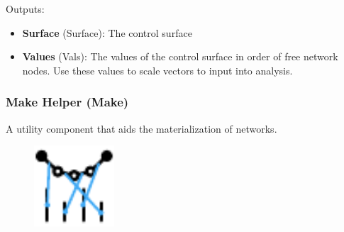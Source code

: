Outputs:
\begin{itemize}
    \setlength\itemsep{0.05em}
    \item \textbf{Surface} (Surface): The control surface
    \item \textbf{Values} (Vals): The values of the control surface in order of free network nodes. Use these values to scale vectors to input into analysis.
\end{itemize}

\subsubsection{Make Helper (Make)} \label{Make}
A utility component that aids the materialization of networks.

\begin{figure}[h]
    \centering
    \includegraphics*[width=3cm]{Figures/Maker}
\end{figure}

